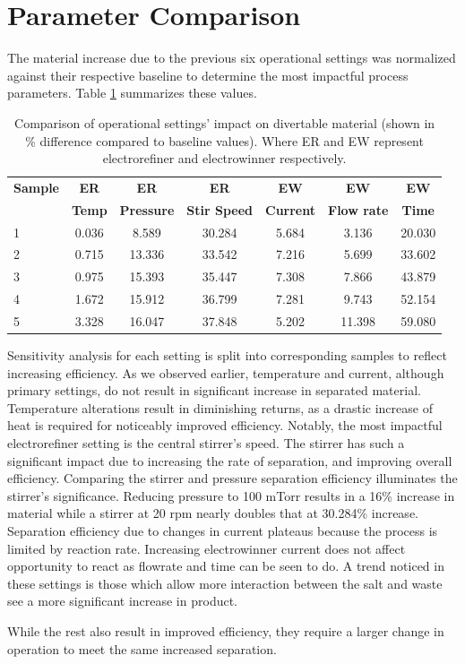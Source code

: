 \section{Parameter Comparison}

The material increase due to the previous six operational settings was normalized against their respective baseline
to determine the most impactful process parameters. Table \ref{tab:compare} summarizes these values.

\begin{table}[h]
	\centering
	\begin{tabularx}{0.9\linewidth}{lcccccc}
		\hline
		\textbf{Sample} & \textbf{ER} & \textbf{ER} & \textbf{ER} & \textbf{EW}
		& \textbf{EW} & \textbf{EW} \\
		& \textbf{Temp} & \textbf{Pressure} & \textbf{Stir Speed} & \textbf{Current} & \textbf{Flow rate} & \textbf{Time} \\
		\hline \hline
		1 & 0.036 & 8.589 & 30.284 & 5.684 & 3.136 & 20.030 \\ \hline
		2 & 0.715 & 13.336 & 33.542 & 7.216 & 5.699 & 33.602 \\ \hline
		3 & 0.975 & 15.393 & 35.447 & 7.308 & 7.866 & 43.879 \\ \hline
		4 & 1.672 & 15.912 & 36.799 & 7.281 & 9.743 & 52.154 \\ \hline
		5 & 3.328 & 16.047 & 37.848 & 5.202 & 11.398 & 59.080 \\ \hline
	\end{tabularx}
	\caption {Comparison of operational settings' impact on divertable material (shown in
		\% difference compared to baseline values). Where ER and EW represent electrorefiner and electrowinner respectively.}
	\label {tab:compare}
\end{table}

Sensitivity analysis for each setting is split into corresponding samples to reflect increasing efficiency. As we observed earlier, temperature and current, although primary settings, 
do not result in significant increase in separated material. Temperature alterations result in diminishing returns, as a drastic increase of heat is required for noticeably improved efficiency. Notably,
the most impactful electrorefiner setting is the central stirrer's speed. The stirrer  
has such a significant impact due to increasing the rate of separation, and improving overall
efficiency. Comparing the stirrer and pressure separation efficiency illuminates the stirrer's significance. Reducing pressure to 100 mTorr results in a 16\% increase in material while a stirrer at 20 rpm nearly doubles that at 30.284\% increase.
Separation efficiency due to changes in current plateaus because the process is limited by reaction rate. Increasing electrowinner current does not affect opportunity to react as flowrate and time can be seen to do. 
A trend noticed in these settings is those which allow more interaction between the salt and waste see a more significant increase in product. 

While the rest also result in
improved efficiency, they require a larger change in operation to meet the same increased separation.